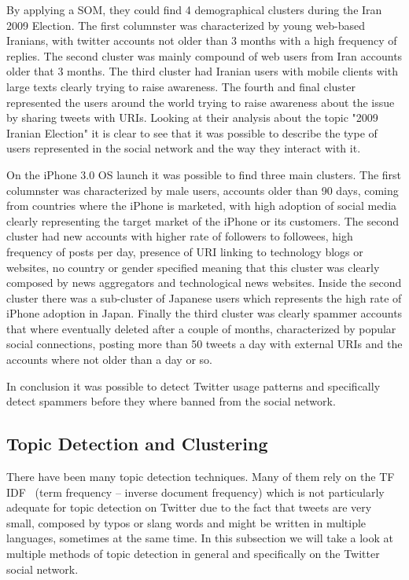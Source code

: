 By applying a SOM, they could find 4 demographical clusters during the Iran 2009 Election. The first columnster was characterized by young web-based Iranians, with twitter accounts not older than 3 months with a high frequency of replies. The second cluster was mainly compound of web users from Iran accounts older that 3 months. The third cluster had Iranian users with mobile clients with large texts clearly trying to raise awareness. The fourth and final cluster represented the users around the world trying to raise awareness about the issue by sharing tweets with URIs.
Looking at their analysis about the topic "2009 Iranian Election" it is clear to see that it was possible to describe the type of users represented in the social network and the way they interact with it.

On the iPhone 3.0 OS launch it was possible to find three main clusters. The first columnster was characterized by male users, accounts older than 90 days, coming from countries where the iPhone is marketed, with high adoption of social media clearly representing the target market of the iPhone or its customers. The second cluster had new accounts with higher rate of followers to followees, high frequency of posts per day, presence of URI linking to technology blogs or websites, no country or gender specified meaning that this cluster was clearly composed by news aggregators and technological news websites. Inside the second cluster there was a sub-cluster of Japanese users which represents the high rate of iPhone adoption in Japan. Finally the third cluster was clearly spammer accounts that where eventually deleted after a couple of months, characterized by popular social connections, posting more than 50 tweets a day with external URIs and the accounts where not older than a day or so.

In conclusion it was possible to detect Twitter usage patterns and specifically detect spammers before they where banned from the social network. 


\subsection{Topic Detection and Clustering} %
\label{sub:topic_detection_on_twitter}
There have been many topic detection techniques. Many of them rely on the TF IDF~\cite{Baeza-Yates:1999:MIR:553876} (term frequency – inverse document frequency) which is not particularly adequate for topic detection on Twitter due to the fact that tweets are very small, composed by typos or slang words and might be written in multiple languages, sometimes at the same time. In this subsection we will take a look at multiple methods of topic detection in general and specifically on the Twitter social network.


